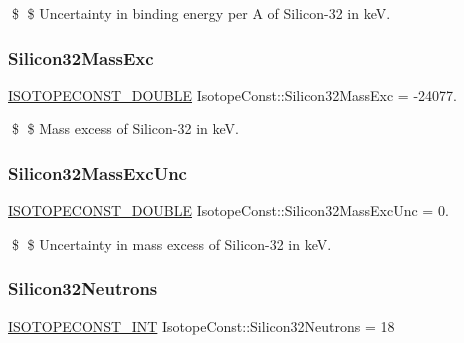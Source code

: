 \$ \$ Uncertainty in binding energy per A of Silicon-\/32 in keV. \mbox{\label{group___isotope_const-_silicon-_si32_ga59bcbda8aa85c3125ca5f58d077c73d5}} 
\subsubsection{\texorpdfstring{Silicon32\+Mass\+Exc}{Silicon32MassExc}}
{\footnotesize\ttfamily \mbox{\hyperlink{group___isotope_const-_macros_ga8f45a7272ce02c0b4c65c44636ed719a}{I\+S\+O\+T\+O\+P\+E\+C\+O\+N\+S\+T\+\_\+\+D\+O\+U\+B\+LE}} Isotope\+Const\+::\+Silicon32\+Mass\+Exc = -\/24077.}

\$ \$ Mass excess of Silicon-\/32 in keV. \mbox{\label{group___isotope_const-_silicon-_si32_gac2defc2a3c2076161426b64e57868950}} 
\subsubsection{\texorpdfstring{Silicon32\+Mass\+Exc\+Unc}{Silicon32MassExcUnc}}
{\footnotesize\ttfamily \mbox{\hyperlink{group___isotope_const-_macros_ga8f45a7272ce02c0b4c65c44636ed719a}{I\+S\+O\+T\+O\+P\+E\+C\+O\+N\+S\+T\+\_\+\+D\+O\+U\+B\+LE}} Isotope\+Const\+::\+Silicon32\+Mass\+Exc\+Unc = 0.}

\$ \$ Uncertainty in mass excess of Silicon-\/32 in keV. \mbox{\label{group___isotope_const-_silicon-_si32_ga544771607af4601906b75ff26619ab67}} 
\subsubsection{\texorpdfstring{Silicon32\+Neutrons}{Silicon32Neutrons}}
{\footnotesize\ttfamily \mbox{\hyperlink{group___isotope_const-_macros_ga5f18360b3e99483a35c32d789e62621c}{I\+S\+O\+T\+O\+P\+E\+C\+O\+N\+S\+T\+\_\+\+I\+NT}} Isotope\+Const\+::\+Silicon32\+Neutrons = 18}

